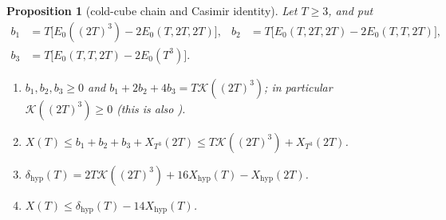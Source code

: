 \documentclass[11pt,a4paper]{amsart}
\newtheorem{proposition}[theorem]{Proposition}
\theoremstyle{definition}
\theoremstyle{remark}
\numberwithin{equation}{section}
\newcommand{\TT}{\mathbb{T}}               %
\newcommand{\Zc}{\mathcal{Z}}              %
\newcommand{\XT}[2]{X_{#1}(#2)}            %
\newcommand{\cube}[1]{(2#1)^3}             %
\begin{document}
\begin{proposition}[cold-cube chain and Casimir identity]\label{prop:casimir-chain}
Let $T\ge3$, and put
\begin{align*}
b_1&=T\bigl[E_0(\cube{T})-2E_0(T,2T,2T)\bigr], & b_2&=T\bigl[E_0(T,2T,2T)-2E_0(T,T,2T)\bigr],\\
b_3&=T\bigl[E_0(T,T,2T)-2E_0(T^3)\bigr].
\end{align*}
\begin{enumerate}[label=(\alph*)]
\item $b_1,b_2,b_3\ge0$ and $b_1+2b_2+4b_3=T\mathcal K(\cube{T})$; in particular $\mathcal K(\cube{T})\ge0$ (this is also \cite[Proposition~13]{bhattacharjee2026first}).
\item $X(T)\le b_1+b_2+b_3+\XT{T^3}{2T}\le T\mathcal K(\cube{T})+\XT{T^3}{2T}$.
\item $\delta_{\mathrm{hyp}}(T)=2T\mathcal K(\cube{T})+16X_{\mathrm{hyp}}(T)-X_{\mathrm{hyp}}(2T)$.
\item $X(T)\le\delta_{\mathrm{hyp}}(T)-14X_{\mathrm{hyp}}(T)$.
\end{enumerate}
\end{proposition}
\end{document}
